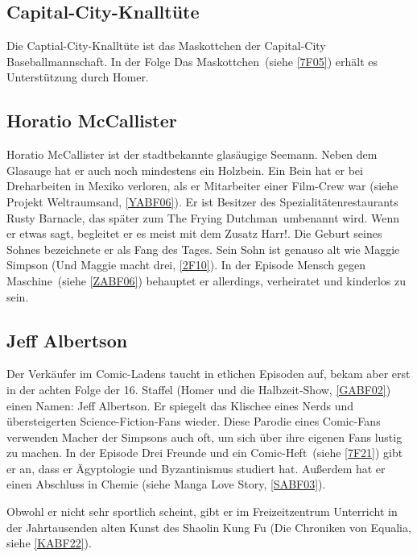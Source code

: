 \subsection{Capital-City-Knalltüte}
Die Captial-City-Knalltüte ist das Maskottchen der Capital-City Baseballmannschaft. In der Folge \glqq Das Maskottchen\grqq\ (siehe \ref{7F05}) erhält es Unterstützung durch Homer.


\subsection{Horatio McCallister}\label{HoratioMcCallister}
Horatio McCallister ist der stadtbekannte glasäugige Seemann. Neben dem Glasauge hat er auch noch mindestens ein Holzbein. Ein Bein hat er bei Dreharbeiten in Mexiko verloren, als er Mitarbeiter einer Film-Crew war (siehe \glqq Projekt Weltraumsand\grqq, \ref{YABF06}). Er ist Besitzer des Spezialitätenrestaurants \glqq Rusty Barnacle\grqq , das später zum \glqq The Frying Dutchman\grqq\ umbenannt wird. Wenn er etwas sagt, begleitet er es meist mit dem Zusatz \glqq Harr!\grqq . Die Geburt seines Sohnes bezeichnete er als \glqq Fang des Tages\grqq . Sein Sohn ist genauso alt wie Maggie Simpson (\glqq Und Maggie macht drei\grqq , \ref{2F10}). In der Episode \glqq Mensch gegen Maschine\grqq\ (siehe \ref{ZABF06}) behauptet er allerdings, verheiratet und kinderlos zu sein.


\subsection{Jeff Albertson}\label{JeffAlbertson}
Der Verkäufer im Comic-Ladens taucht in etlichen Episoden auf, bekam aber erst in der achten Folge der 16. Staffel (\glqq Homer und die Halbzeit-Show\grqq , \ref{GABF02}) einen Namen: Jeff Albertson. Er spiegelt das Klischee eines Nerds und über\-stei\-ger\-ten Science-Fiction-Fans wieder. Diese Parodie eines Comic-Fans verwenden Macher der Simpsons auch oft, um sich über ihre eigenen Fans lustig zu machen. In der Episode \glqq Drei Freunde und ein Comic-Heft\grqq\ (siehe \ref{7F21}) gibt er an, dass er Ägyptologie und Byzantinismus studiert hat. Außerdem hat er einen Abschluss in Chemie (siehe \glqq Manga Love Story\grqq , \ref{SABF03}).

Obwohl er nicht sehr sportlich scheint, gibt er im Freizeitzentrum Unterricht in der Jahrtausenden alten Kunst des Shaolin Kung Fu (\glqq Die Chroniken von Equalia\grqq , siehe \ref{KABF22}).

